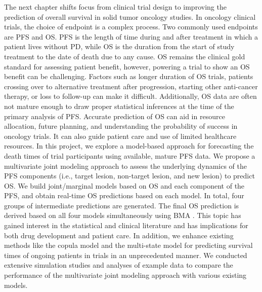 The next chapter shifts focus from clinical trial design to improving the prediction of overall survival in solid tumor oncology studies. In oncology clinical trials, the choice of endpoint is a complex process. Two commonly used endpoints are \ac{PFS} and \ac{OS}. \ac{PFS} is the length of time during and after treatment in which a patient lives without \ac{PD}, while \ac{OS} is the duration from the start of study treatment to the date of death due to any cause. \ac{OS} remains the clinical gold standard for assessing patient benefit, however, powering a trial to show an \ac{OS} benefit can be challenging. Factors such as longer duration of \ac{OS} trials, patients crossing over to alternative treatment after progression, starting other anti-cancer therapy, or loss to follow-up can make it difficult. Additionally, \ac{OS} data are often not mature enough to draw proper statistical inferences at the time of the primary analysis of \ac{PFS}. Accurate prediction of \ac{OS} can aid in resource allocation, future planning, and understanding the probability of success in oncology trials. It can also guide patient care and use of limited healthcare resources. In this project, we explore a model-based approach for forecasting the death times of trial participants using available, mature \ac{PFS} data. We propose a multivariate joint modeling approach to assess the underlying dynamics of the \ac{PFS} components (i.e., target lesion, non-target lesion, and new lesion) to predict \ac{OS}. We build joint/marginal models based on \ac{OS} and each component of the \ac{PFS}, and obtain real-time \ac{OS} predictions based on each model. In total, four groups of intermediate predictions are generated. The final \ac{OS} prediction is derived based on all four models simultaneously using \ac{BMA} \citep{hoeting1999bayesian}. This topic has gained interest in the statistical and clinical literature and has implications for both drug development and patient care. In addition, we enhance existing methods like the copula model and the multi-state model for predicting survival times of ongoing patients in trials in an unprecedented manner. We conducted extensive simulation studies and analyses of example data to compare the performance of the multivariate joint modeling approach with various existing models.

